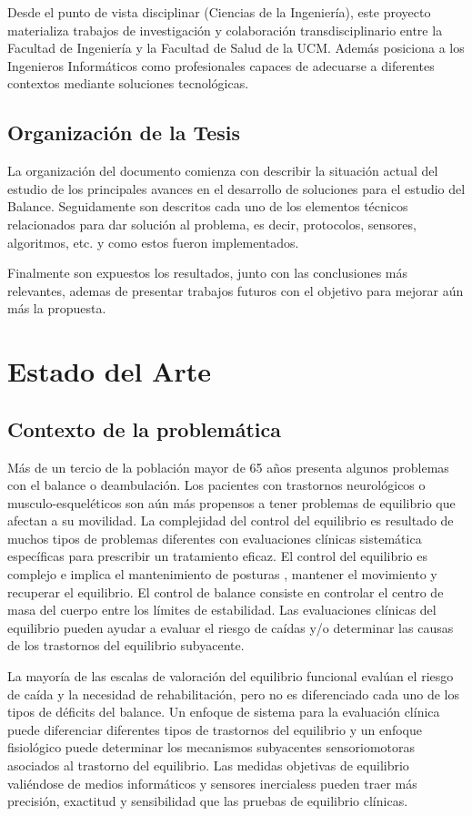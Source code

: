 \documentclass[12pt,a4paper]{article}
\begin{document}
Desde el punto de vista disciplinar (Ciencias de la Ingeniería), este proyecto materializa trabajos de investigación y colaboración transdisciplinario entre la Facultad de Ingeniería y la Facultad de Salud de la UCM. Además posiciona a los Ingenieros Informáticos como profesionales capaces de adecuarse a diferentes contextos mediante soluciones tecnológicas.

\subsection{Organizaci\'on de la Tesis}
La organización del documento comienza con describir la situación actual del estudio de los principales avances en el desarrollo de soluciones para el estudio del Balance. Seguidamente son descritos cada uno de los elementos técnicos relacionados para dar solución al problema, es decir,  protocolos, sensores, algoritmos, etc. y como estos fueron implementados.

Finalmente son expuestos los resultados, junto con las conclusiones más relevantes, ademas de presentar trabajos futuros con el objetivo para mejorar aún más la propuesta.


\section{Estado del Arte}

\subsection{Contexto de la problemática}
Más de un tercio de la población mayor de 65 años presenta algunos problemas con el balance o deambulación. Los pacientes con trastornos neurológicos o musculo-esqueléticos son aún más propensos a tener problemas de equilibrio que afectan a su movilidad. La complejidad del control del equilibrio es resultado  de muchos tipos de problemas diferentes con evaluaciones clínicas sistemática específicas para prescribir un tratamiento eficaz.
El control del equilibrio es complejo e implica el mantenimiento de posturas \cite{mancini_relevance_2010}, mantener el movimiento y recuperar el equilibrio. El control de balance consiste en controlar el centro de masa del cuerpo entre los límites de estabilidad. Las evaluaciones clínicas del equilibrio pueden ayudar a evaluar el riesgo de caídas y/o determinar las causas de los trastornos del equilibrio subyacente.

La mayoría de las escalas de valoración del equilibrio funcional evalúan el riesgo de caída y la necesidad de rehabilitación, pero no es diferenciado cada uno de los tipos de déficits del balance. Un enfoque de sistema para la evaluación clínica puede diferenciar diferentes tipos de trastornos del equilibrio y un enfoque fisiológico puede determinar los mecanismos subyacentes sensoriomotoras asociados al trastorno del equilibrio. Las medidas objetivas de equilibrio valiéndose de medios informáticos y sensores inercialess pueden traer más precisión, exactitud y sensibilidad que las pruebas de equilibrio clínicas\cite{chaudhry_measurement_2011}.
\end{document}
